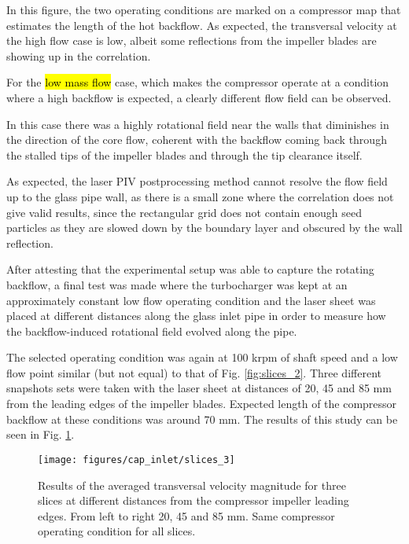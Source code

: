 In this figure, the two operating conditions are marked on a compressor map that estimates the length of the hot backflow. As expected, the transversal velocity at the high flow case is low, albeit some reflections from the impeller blades are showing up in the correlation.

For the \hl{low mass flow} case, which makes the compressor operate at a condition where a high backflow is expected, a clearly different flow field can be observed. 

In this case there was a highly rotational field near the walls that diminishes in the direction of the core flow, coherent with the backflow coming back through the stalled tips of the impeller blades and through the tip clearance itself.

As expected, the laser PIV postprocessing method cannot resolve the flow field up to the glass pipe wall, as there is a small zone where the correlation does not give valid results, since the rectangular grid does not contain enough seed particles as they are slowed down by the boundary layer and obscured by the wall reflection.

After attesting that the experimental setup was able to capture the rotating backflow, a final test was made where the turbocharger was kept at an approximately constant low flow operating condition and the laser sheet was placed at different distances along the glass inlet pipe in order to measure how the backflow-induced rotational field evolved along the pipe. 

The selected operating condition was again at 100 krpm of shaft speed and a low flow point similar (but not equal) to that of Fig. \ref{fig:slices_2}. Three different snapshots sets were taken with the laser sheet at distances of 20, 45 and 85 mm from the leading edges of the impeller blades. Expected length of the compressor backflow at these conditions was around 70 mm. The results of this study can be seen in Fig. \ref{fig:slices_3}.

\begin{figure}[bt!]
\hspace{-0.1\textwidth}
\texttt{[image: figures/cap\_inlet/slices\_3]}
\caption{Results of the averaged transversal velocity magnitude for three slices at different distances from the compressor impeller leading edges. From left to right 20, 45 and 85 mm. Same compressor operating condition for all slices.}
\label{fig:slices_3}
\end{figure}

